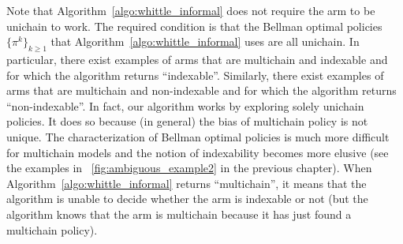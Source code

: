 Note that Algorithm~\ref{algo:whittle_informal} does not require the arm to be unichain to work.
The required condition is that the Bellman optimal policies $\{\pi^k\}_{k\ge1}$ that Algorithm~\ref{algo:whittle_informal} uses are all unichain.
In particular, there exist examples of arms that are multichain and indexable and for which the algorithm returns ``indexable''.
Similarly, there exist examples of arms that are multichain and non-indexable and for which the algorithm returns ``non-indexable''.
In fact, our algorithm works by exploring solely unichain policies. It does so because (in general) the bias of  multichain policy is not unique.
The characterization of Bellman optimal policies is much more difficult for multichain models and the notion of indexability becomes more elusive (see the examples in \figurename~\ref{fig:ambiguous_example2} in the previous chapter).
When Algorithm~\ref{algo:whittle_informal} returns ``multichain'', it means that the algorithm is unable to decide whether the arm is indexable or not (but the algorithm knows that the arm is multichain because it has just found a multichain policy).

